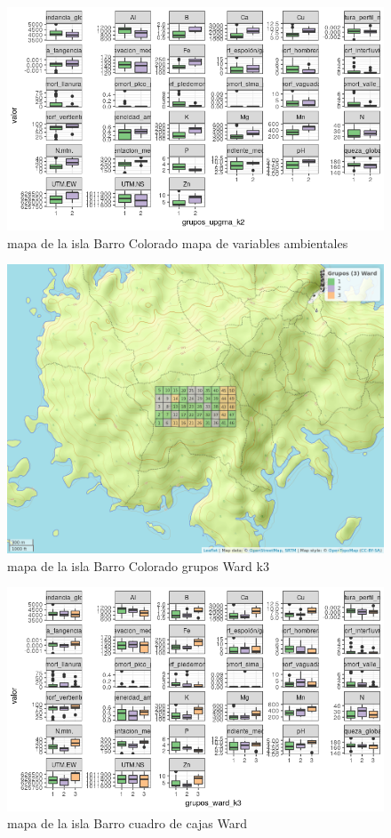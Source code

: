 \documentclass[11pt,]{article}
\begin{document}
\begin{figure}
\centering
\includegraphics[width=1.00000\textwidth]{mapas_variables_ambientales.png}
\caption{mapa de la isla Barro Colorado mapa de variables ambientales
\label{fig:bci_map}}
\end{figure}

\begin{figure}
\centering
\includegraphics[width=1.00000\textwidth]{mapa_ward_k3.png}
\caption{mapa de la isla Barro Colorado grupos Ward k3
\label{fig:bci_map}}
\end{figure}

\begin{figure}
\centering
\includegraphics[width=1.00000\textwidth]{cuadro_cajas_ward.png}
\caption{mapa de la isla Barro cuadro de cajas Ward \label{fig:bci_map}}
\end{figure}
\end{document}
